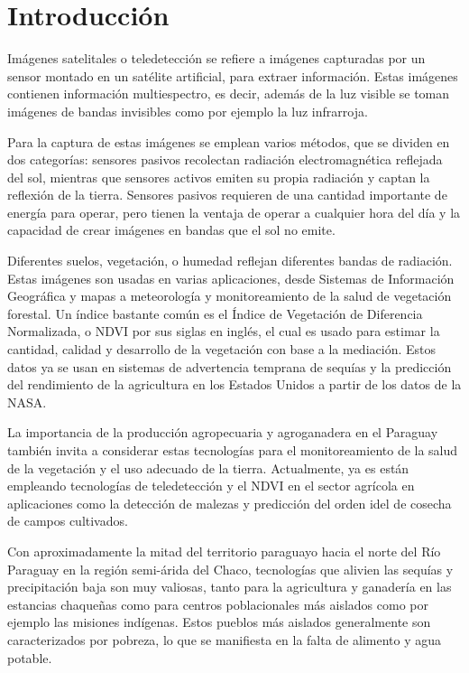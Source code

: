 \section{Introducción}

Imágenes satelitales o teledetección se refiere a imágenes capturadas por un sensor montado en un satélite artificial,
para extraer información. Estas imágenes contienen información multiespectro, es decir, además de la luz visible se
toman imágenes de bandas invisibles como por ejemplo la luz infrarroja. \autocite{globalforestlink-how-sat-imaging-work}

Para la captura de estas imágenes se emplean varios métodos, que se dividen en dos categorías: sensores pasivos
recolectan radiación electromagnética reflejada del sol, mientras que sensores activos emiten su propia radiación y
captan la reflexión de la tierra. Sensores pasivos requieren de una cantidad importante de energía para operar, pero
tienen la ventaja de operar a cualquier hora del día y la capacidad de crear imágenes en bandas que el sol no emite.
\autocite{globalforestlink-how-sat-imaging-work}

Diferentes suelos, vegetación, o humedad reflejan diferentes bandas de radiación. Estas imágenes son usadas en varias
aplicaciones, desde Sistemas de Información Geográfica y mapas a meteorología y monitoreamiento de la salud de
vegetación forestal. Un índice bastante común es el Índice de Vegetación de Diferencia Normalizada, o NDVI por sus
siglas en inglés, el cual es usado para estimar la cantidad, calidad y desarrollo de la vegetación con base a la
mediación. Estos datos ya se usan en sistemas de advertencia temprana de sequías y la predicción del rendimiento de la
agricultura en los Estados Unidos a partir de los datos de la NASA. \autocite{earthdata-vegetation}

La importancia de la producción agropecuaria y agroganadera en el Paraguay también invita a considerar estas
tecnologías para el monitoreamiento de la salud de la vegetación y el uso adecuado de la tierra. Actualmente, ya es
están empleando tecnologías de teledetección y el NDVI en el sector agrícola en aplicaciones como la detección de
malezas y predicción del orden idel de cosecha de campos cultivados. \autocite{onesoil-agricultura-paraguay}

Con aproximadamente la mitad del territorio paraguayo hacia el norte del Río Paraguay en la región semi-árida del
Chaco, tecnologías que alivien las sequías y precipitación baja son muy valiosas, tanto para la agricultura y ganadería
en las estancias chaqueñas como para centros poblacionales más aislados como por ejemplo las misiones indígenas. Estos
pueblos más aislados generalmente son caracterizados por pobreza, lo que se manifiesta en la falta de alimento y agua
potable.

